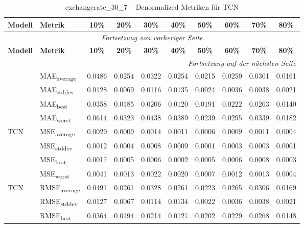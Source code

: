 {\small
\begin{longtable}{l l c c c c c c c c}
    \toprule
    \textbf{Modell} & \textbf{Metrik} & \textbf{10\%} & \textbf{20\%} & \textbf{30\%} & \textbf{40\%} & \textbf{50\%} & \textbf{60\%} & \textbf{70\%} & \textbf{80\%} \\
    \midrule
    \endfirsthead
    \multicolumn{10}{c}{\textit{Fortsetzung von vorheriger Seite}} \\
    \toprule
    \textbf{Modell} & \textbf{Metrik} & \textbf{10\%} & \textbf{20\%} & \textbf{30\%} & \textbf{40\%} & \textbf{50\%} & \textbf{60\%} & \textbf{70\%} & \textbf{80\%} \\
    \midrule
    \endhead
    \midrule
    \multicolumn{10}{r}{\textit{Fortsetzung auf der nächsten Seite}} \\
    \midrule
    \endfoot
    \bottomrule
    \caption{exchangerate_30_7 -- Denormalized Metriken für TCN}
    \label{tab:exchangerate_30_7_denormalized_tcn}
    \endlastfoot
\multirow{4}{*}{TCN} & MAE\textsubscript{average} & 0.0486 & 0.0254 & 0.0322 & 0.0254 & 0.0215 & 0.0259 & 0.0301 & 0.0161 \\
 & MAE\textsubscript{stddev} & 0.0128 & 0.0069 & 0.0116 & 0.0135 & 0.0024 & 0.0036 & 0.0038 & 0.0021 \\
 & MAE\textsubscript{best} & 0.0358 & 0.0185 & 0.0206 & 0.0120 & 0.0191 & 0.0222 & 0.0263 & 0.0140 \\
 & MAE\textsubscript{worst} & 0.0614 & 0.0323 & 0.0438 & 0.0389 & 0.0239 & 0.0295 & 0.0339 & 0.0182 \\
\cmidrule(lr){2-10}
\multirow{4}{*}{TCN} & MSE\textsubscript{average} & 0.0029 & 0.0009 & 0.0014 & 0.0011 & 0.0006 & 0.0009 & 0.0011 & 0.0004 \\
 & MSE\textsubscript{stddev} & 0.0012 & 0.0004 & 0.0008 & 0.0009 & 0.0001 & 0.0003 & 0.0003 & 0.0001 \\
 & MSE\textsubscript{best} & 0.0017 & 0.0005 & 0.0006 & 0.0002 & 0.0005 & 0.0006 & 0.0008 & 0.0003 \\
 & MSE\textsubscript{worst} & 0.0041 & 0.0013 & 0.0022 & 0.0020 & 0.0007 & 0.0012 & 0.0013 & 0.0004 \\
\cmidrule(lr){2-10}
\multirow{4}{*}{TCN} & RMSE\textsubscript{average} & 0.0491 & 0.0261 & 0.0328 & 0.0261 & 0.0223 & 0.0265 & 0.0306 & 0.0169 \\
 & RMSE\textsubscript{stddev} & 0.0127 & 0.0067 & 0.0114 & 0.0134 & 0.0022 & 0.0036 & 0.0038 & 0.0021 \\
 & RMSE\textsubscript{best} & 0.0364 & 0.0194 & 0.0214 & 0.0127 & 0.0202 & 0.0229 & 0.0268 & 0.0148 \\

\end{longtable}}
